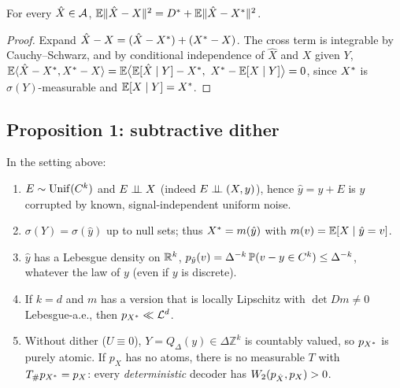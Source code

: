 \begin{lemma}[Orthogonality]\label{lem:orth}
For every $\hat X\in\mathcal{A}$, \quad $\mathbb{E}\|\hat X-X\|^2=D^{*}+\mathbb{E}\|\hat X-X^{*}\|^2$.
\end{lemma}
\begin{proof}
Expand $\hat X-X=(\hat X-X^{*})+(X^{*}-X)$. The cross term is integrable by Cauchy--Schwarz, and by conditional independence of $\hat X$ and $X$ given $Y$,
$\mathbb{E}\langle \hat X-X^{*},X^{*}-X\rangle=\mathbb{E}\bigl\langle \mathbb{E}[\hat X\mid Y]-X^{*},\ X^{*}-\mathbb{E}[X\mid Y]\bigr\rangle=0$,
since $X^{*}$ is $\sigma(Y)$-measurable and $\mathbb{E}[X\mid Y]=X^{*}$.
\end{proof}

\subsection{Proposition 1: subtractive dither}

\begin{proposition}\label{prop:dither}
In the setting above:
\begin{enumerate}
  \item[(a)] $E\sim\mathrm{Unif}(C^k)$ and $E\perp\!\!\!\perp X$ (indeed $E\perp\!\!\!\perp(X,y)$), hence $\hat y=y+E$ is $y$ corrupted by known, signal-independent uniform noise.
  \item[(b)] $\sigma(Y)=\sigma(\hat y)$ up to null sets; thus $X^{*}=m(\hat y)$ with $m(v)=\mathbb{E}[X\mid\hat y=v]$.
  \item[(c)] $\hat y$ has a Lebesgue density on $\mathbb{R}^k$, $p_{\hat y}(v)=\Delta^{-k}\,\mathbb{P}(v-y\in C^k)\le\Delta^{-k}$, whatever the law of $y$ (even if $y$ is discrete).
  \item[(d)] If $k=d$ and $m$ has a version that is locally Lipschitz with $\det Dm\neq 0$ Lebesgue-a.e., then $p_{X^{*}}\ll\mathcal{L}^d$.
  \item[(e)] Without dither ($U\equiv 0$), $Y=Q_\Delta(y)\in\Delta\mathbb{Z}^k$ is countably valued, so $p_{X^{*}}$ is purely atomic. If $p_X$ has no atoms, there is no measurable $T$ with $T_\#p_{X^{*}}=p_X$: every \emph{deterministic} decoder has $W_2(p_{\hat X},p_X)>0$.
\end{enumerate}
\end{proposition}

